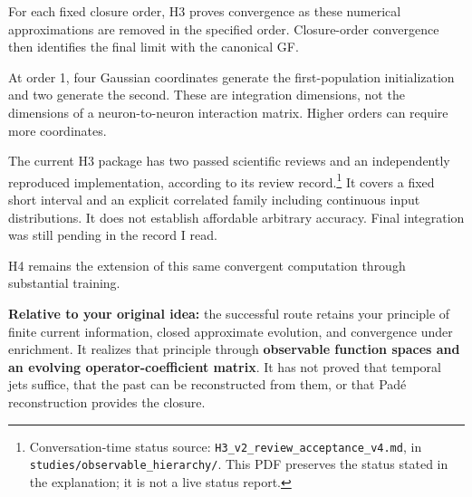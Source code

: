 \documentclass[11pt,a4paper]{scrartcl}
\begin{document}
For each fixed closure order, H3 proves convergence as these numerical approximations are removed in the specified order. Closure-order convergence then identifies the final limit with the canonical GF.

At order 1, four Gaussian coordinates generate the first-population initialization and two generate the second. These are integration dimensions, not the dimensions of a neuron-to-neuron interaction matrix. Higher orders can require more coordinates.

The current H3 package has two passed scientific reviews and an independently reproduced implementation, according to its review record.\footnote{Conversation-time status source: \texttt{H3\_v2\_review\_acceptance\_v4.md}, in \texttt{studies/observable\_hierarchy/}. This PDF preserves the status stated in the explanation; it is not a live status report.} It covers a fixed short interval and an explicit correlated family including continuous input distributions. It does not establish affordable arbitrary accuracy. Final integration was still pending in the record I read.

H4 remains the extension of this same convergent computation through substantial training.

\textbf{Relative to your original idea:} the successful route retains your principle of finite current information, closed approximate evolution, and convergence under enrichment. It realizes that principle through \textbf{observable function spaces and an evolving operator-coefficient matrix}. It has not proved that temporal jets suffice, that the past can be reconstructed from them, or that Padé reconstruction provides the closure.
\end{document}
